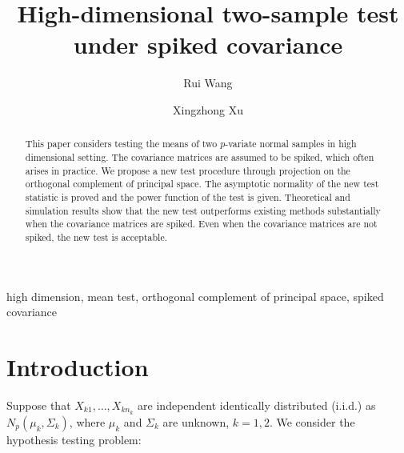 \documentclass[review]{elsarticle}
\theoremstyle{plain}
\theoremstyle{definition}
\theoremstyle{remark}
\begin{document}
\begin{frontmatter}

\title{High-dimensional two-sample test under spiked covariance}

    \author[mymainaddress]{Rui Wang}
    \author[mymainaddress,mysecondaryaddress]{Xingzhong Xu}
    \address[mymainaddress]{School of Mathematics and Statistics, Beijing Institute of Technology, Beijing 
    100081,China}
    \address[mysecondaryaddress]{Beijing Key Laboratory on MCAACI, Beijing Institute of Technology, Beijing 100081,China}




\begin{abstract}
    This paper considers testing the means of two $p$-variate normal samples in high dimensional setting.  The covariance matrices are assumed to be spiked, which often arises in practice. 
    We propose a new test procedure through projection on the orthogonal complement of principal space.
    The asymptotic normality of the new test statistic is proved and the power function of the test is given.
    Theoretical and simulation results show that the new test outperforms existing methods substantially when the covariance matrices are spiked. Even when the covariance matrices are not spiked, the new test is acceptable.
\end{abstract}

\begin{keyword}
    high dimension, mean test, orthogonal complement of principal space, spiked covariance
\end{keyword}

\end{frontmatter}




\section{Introduction}

Suppose that $X_{k1},\ldots,X_{kn_k}$  are independent identically distributed (i.i.d.) as $N_p(\mu_k,\Sigma_k)$, where $\mu_k$ and $\Sigma_k$ are unknown, $k=1,2$. We consider the hypothesis testing problem:
\end{document}

